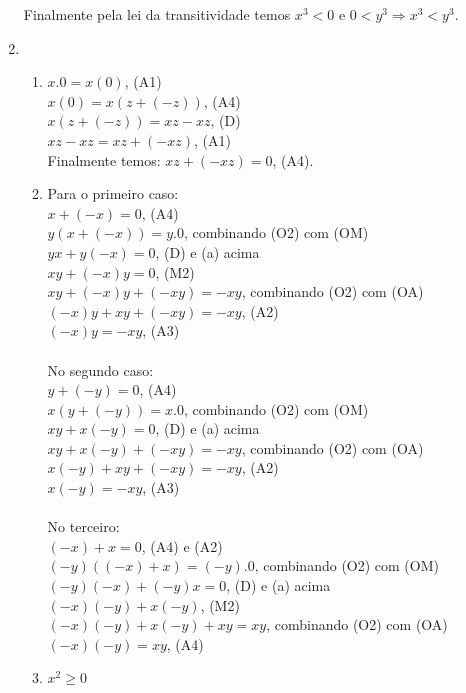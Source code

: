 \documentclass[10pt]{book}
\begin{document}
\begin{enumerate}
	Finalmente pela lei da transitividade temos $x^3 < 0$ e $0 < y^3 \Rightarrow x^3 < y^3$.
	
	\item %
		\begin{enumerate}
			\item %
			$x.0 = x(0)$, (A1)\\
			$ x(0) = x(z + (-z))$, (A4)\\ 
			$x(z + (-z)) = xz - xz $, (D)\\
			$xz - xz = xz + (-xz) $, (A1)\\ 
			Finalmente temos: $xz + (-xz) = 0$, (A4).
			\item %
			Para o primeiro caso:\\
			$x + (-x) = 0$, (A4)\\							
			$y(x + (-x)) = y.0$, combinando (O2) com (OM)\\
			$yx + y(-x) = 0$, (D) e (a) acima\\
			$xy + (-x)y = 0$, (M2)\\						
			$xy + (-x)y + (-xy) = -xy$, combinando (O2) com (OA)\\
			$(-x)y + xy + (-xy) = -xy$, (A2)\\
			$(-x)y = -xy$, (A3)\\	
			\\	
			No segundo caso:\\
			$y + (-y) = 0$, (A4)\\							
			$x(y + (-y)) = x.0$, combinando (O2) com (OM)\\
			$xy + x(-y) = 0$, (D) e (a) acima\\
			$xy + x(-y) + (-xy) = -xy$, combinando (O2) com (OA)\\
			$x(-y) + xy + (-xy) = -xy$, (A2)\\
			$x(-y) = -xy$, (A3)\\		
			\\
			No terceiro:\\
			$(-x) + x = 0$, (A4) e (A2)\\
			$(-y)((-x) + x) = (-y).0$, combinando (O2) com (OM)\\
			$(-y)(-x) + (-y)x = 0$, (D) e (a) acima\\
			$(-x)(-y) + x(-y)$, (M2)\\
			$(-x)(-y) + x(-y) + xy = xy$, combinando (O2) com (OA)\\
			$(-x)(-y) = xy$, (A4)
			\item %
			$x^2 \geq 0$\\

\end{enumerate}
\end{enumerate}
\end{document}
